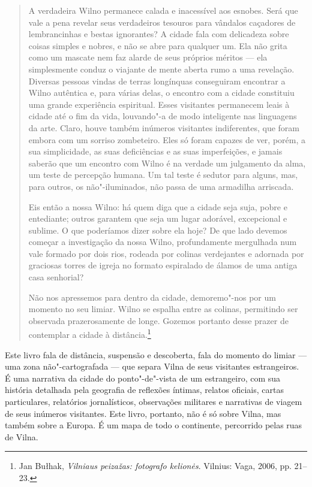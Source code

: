 

\begin{quote}
A verdadeira Wilno permanece calada e inacessível aos esnobes. Será que
vale a pena revelar seus verdadeiros tesouros para vândalos caçadores de
lembrancinhas e bestas ignorantes? A cidade fala com delicadeza sobre
coisas simples e nobres, e não se abre para qualquer um. Ela não grita
como um mascate nem faz alarde de seus próprios méritos --- ela
simplesmente conduz o viajante de mente aberta rumo a uma revelação.
Diversas pessoas vindas de terras longínquas conseguiram encontrar a
Wilno autêntica e, para várias delas, o encontro com a cidade constituiu
uma grande experiência espiritual. Esses visitantes permanecem leais à
cidade até o fim da vida, louvando"-a de modo inteligente nas linguagens
da arte. Claro, houve também inúmeros visitantes indiferentes, que foram
embora com um sorriso zombeteiro. Eles só foram capazes de ver, porém, a
sua simplicidade, as suas deficiências e as suas imperfeições, e jamais
saberão que um encontro com Wilno é na verdade um julgamento da alma, um
teste de percepção humana. Um tal teste é sedutor para alguns, mas, para
outros, os não"-iluminados, não passa de uma armadilha arriscada.

Eis então a nossa Wilno: há quem diga que a cidade seja suja, pobre e
entediante; outros garantem que seja um lugar adorável, excepcional e
sublime. O que poderíamos dizer sobre ela hoje? De que lado devemos
começar a investigação da nossa Wilno, profundamente mergulhada num vale
formado por dois rios, rodeada por colinas verdejantes e adornada por
graciosas torres de igreja no formato espiralado de álamos de uma antiga
casa senhorial?

Não nos apressemos para dentro da cidade, demoremo"-nos por um momento no
seu limiar. Wilno se espalha entre as colinas, permitindo ser observada
prazerosamente de longe. Gozemos portanto desse prazer de contemplar a
cidade à distância.\footnote{Jan Bułhak, \emph{Vilniaus peizažas:
  fotografo kelionės}. Vilnius: Vaga, 2006, pp. 21--23.}
\end{quote}

\asterisc

Este livro fala de distância, suspensão e descoberta, fala do momento do
limiar --- uma zona não"-cartografada --- que separa Vilna de seus visitantes
estrangeiros. É uma narrativa da cidade do ponto"-de"-vista de um
estrangeiro, com sua história detalhada pela geografia de reflexões
íntimas, relatos oficiais, cartas particulares, relatórios
jornalísticos, observações militares e narrativas de viagem de seus
inúmeros visitantes. Este livro, portanto, não é só sobre Vilna, mas
também sobre a Europa. É um mapa de todo o continente, percorrido pelas
ruas de Vilna.

